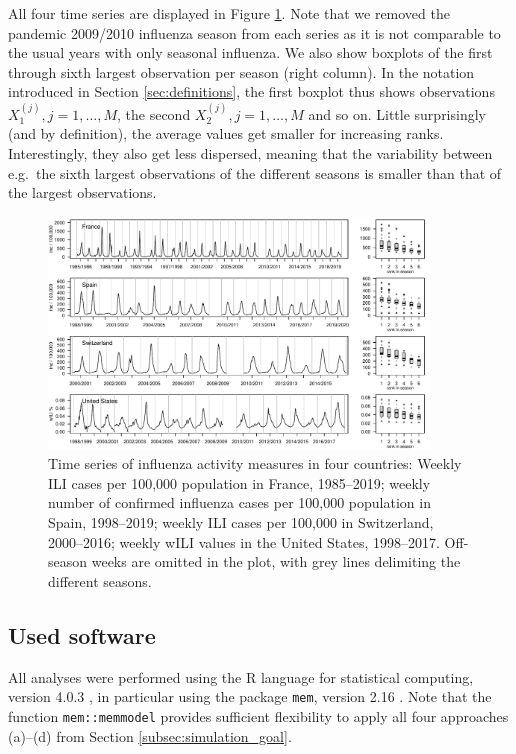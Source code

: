 \documentclass{article}
\begin{document}
All four time series are displayed in Figure \ref{fig:data}. Note that we removed the pandemic 2009/2010 influenza season from each series as it is not comparable to the usual years with only seasonal influenza. We also show boxplots of the first through sixth largest observation per season (right column). In the notation introduced in Section \ref{sec:definitions}, the first boxplot thus shows observations $X_1^{(j)}, j = 1, \dots, M$, the second $X_2^{(j)}, j = 1, \dots, M$ and so on. Little surprisingly (and by definition), the average values get smaller for increasing ranks. Interestingly, they also get less dispersed, meaning that the variability between e.g.\ the sixth largest observations of the different seasons is smaller than that of the largest observations. 


\begin{figure}[h]
\center
\includegraphics[width=0.9\textwidth]{figure/plot_data.pdf}
\caption{Time series of influenza activity measures in four countries: Weekly ILI cases per 100,000 population in France, 1985--2019; weekly number of confirmed influenza cases per 100,000 population in Spain, 1998--2019; weekly ILI cases per 100,000 in Switzerland, 2000--2016; weekly wILI values in the United States, 1998--2017. Off-season weeks are omitted in the plot, with grey lines delimiting the different seasons.}
\label{fig:data}
\end{figure}

\subsection{Used software}

All analyses were performed using the R language for statistical computing, version 4.0.3 \citep{RCT2020}, in particular using the package \texttt{mem}, version 2.16 \citep{Lozano2020}. Note that the function \texttt{mem::memmodel} provides sufficient flexibility to apply all four approaches (a)--(d) from Section \ref{subsec:simulation_goal}.
\end{document}
